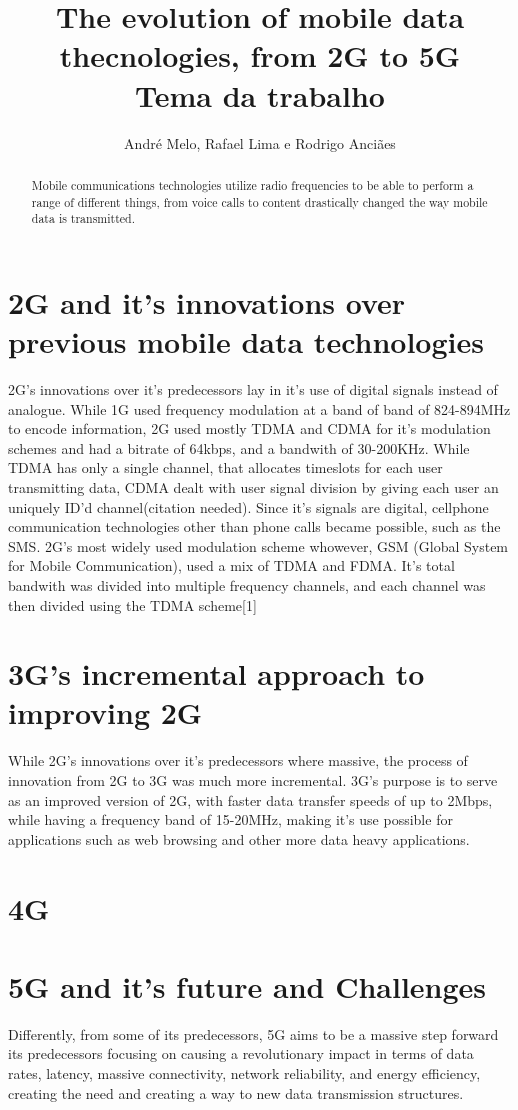 \documentclass{article}
\title{The evolution of mobile data thecnologies, from 2G to 5G\\
	\large Tema da trabalho \\}
\author{André Melo, Rafael Lima e Rodrigo Anciães}
\begin{document}
\maketitle
\begin{abstract}
Mobile communications technologies utilize radio frequencies to be able to perform a range of different things, from voice calls to content drastically changed the way mobile data is transmitted.
\end{abstract}
\pagebreak

\section{2G and it's innovations over previous mobile data technologies}
2G's innovations over it's predecessors lay in it's use of digital signals instead of analogue. While 1G used frequency modulation at a band of band of 824-894MHz to encode information, 2G used mostly TDMA and CDMA for it's modulation schemes and had a bitrate of 64kbps, and a bandwith of 30-200KHz. While TDMA has only a single channel, that allocates timeslots for each user transmitting data, CDMA dealt with user signal division by giving each user an uniquely ID'd channel(citation needed). Since it's signals are digital, cellphone communication technologies other than phone calls became possible, such as the SMS. 2G's most widely used modulation scheme whowever, GSM (Global System for Mobile Communication), used a mix of TDMA and FDMA. It's total bandwith was divided into multiple frequency channels, and each channel was then divided using the TDMA scheme[1]

\section{3G's incremental approach to improving 2G}
While 2G's innovations over it's predecessors where massive, the process of innovation from 2G to 3G was much more incremental. 3G's purpose is to serve as an improved version of 2G, with faster data transfer speeds of up to 2Mbps, while having a frequency band of 15-20MHz, making it's use possible for applications such as web browsing and other more data heavy applications.

\section{4G}

\section{5G and it's future and Challenges}
Differently, from some of its predecessors, 5G aims to be a massive step forward its predecessors focusing on causing a revolutionary impact in terms of data rates, latency, massive connectivity, network reliability, and energy efficiency, creating the need and creating a way to new data transmission structures.
\end{document}
